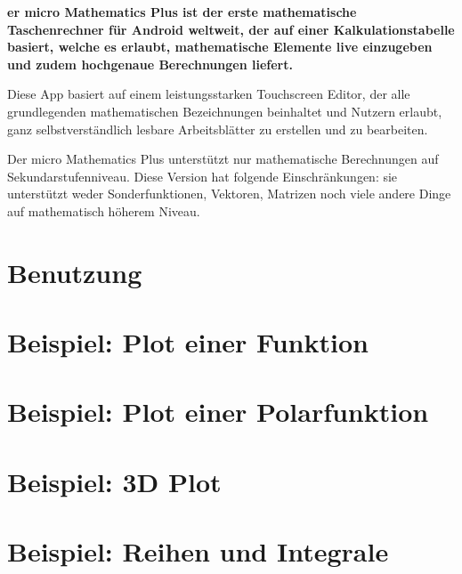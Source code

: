 \documentclass[DIV=calc, paper=a4, fontsize=11pt, twocolumn]{scrartcl}
\begin{document}
\maketitle
\thispagestyle{fancy} %

\textbf{er micro Mathematics Plus ist der erste mathematische
Taschenrechner für Android weltweit, der auf einer Kalkulationstabelle basiert,
welche es erlaubt, mathematische Elemente live einzugeben und zudem hochgenaue
Berechnungen liefert.}

\begin{bf}
Diese App basiert auf einem leistungsstarken Touchscreen Editor, der alle
grundlegenden mathematischen Bezeichnungen beinhaltet und Nutzern erlaubt, ganz
selbstverständlich lesbare Arbeitsblätter zu erstellen und zu bearbeiten.

Der micro Mathematics Plus unterstützt nur mathematische Berechnungen auf
Sekundarstufenniveau. Diese Version hat folgende Einschränkungen: sie
unterstützt weder Sonderfunktionen, Vektoren, Matrizen noch viele andere Dinge
auf mathematisch höherem Niveau.
\end{bf}

\section{Benutzung}


\section{Beispiel: Plot einer Funktion}


\section{Beispiel: Plot einer Polarfunktion}


\section{Beispiel: 3D Plot}


\section{Beispiel: Reihen und Integrale}

\end{document}
